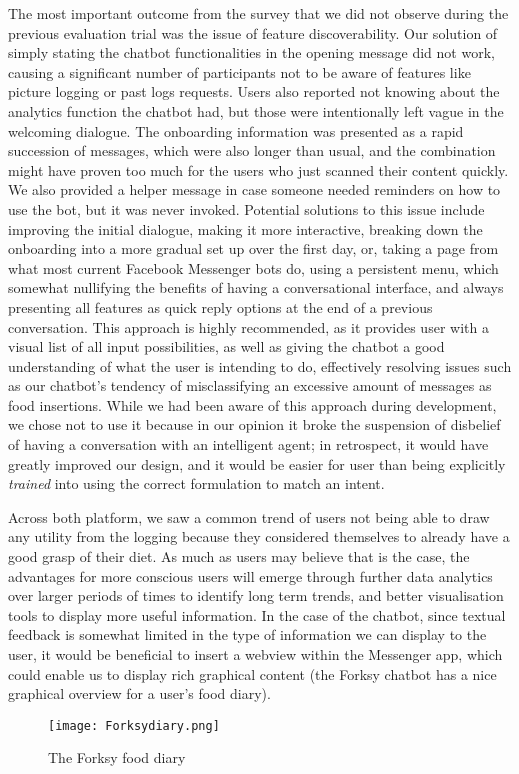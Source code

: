 The most important outcome from the survey that we did not observe during the previous evaluation trial was the issue of feature discoverability. Our solution of simply stating the chatbot functionalities in the opening message did not work, causing a significant number of participants not to be aware of features like picture logging or past logs requests. Users also reported not knowing about the analytics function the chatbot had, but those were intentionally left vague in the welcoming dialogue. The onboarding information was presented as a rapid succession of messages, which were also longer than usual, and the combination might have proven too much for the users who just scanned their content quickly. We also provided a helper message in case someone needed reminders on how to use the bot, but it was never invoked. Potential solutions to this issue include improving the initial dialogue, making it more interactive, breaking down the onboarding into a more gradual set up over the first day, or, taking a page from what most current Facebook Messenger bots do, using a persistent menu, which somewhat nullifying the benefits of having a conversational interface, and always presenting all features as quick reply options at the end of a previous conversation. This approach is highly recommended, as it provides user with a visual list of all input possibilities, as well as giving the chatbot a good understanding of what the user is intending to do, effectively resolving issues such as our chatbot's tendency of misclassifying an excessive amount of messages as food insertions. While we had been aware of this approach during development, we chose not to use it because in our opinion it broke the suspension of disbelief of having a conversation with an intelligent agent; in retrospect, it would have greatly improved our design, and it would be easier for user than being explicitly \textit{trained} into using the correct formulation to match an intent. 

Across both platform, we saw a common trend of users not being able to draw any utility from the logging because they considered themselves to already have a good grasp of their diet. As much as users may believe that is the case, the advantages for more conscious users will emerge through further data analytics over larger periods of times to identify long term trends, and better visualisation tools to display more useful information. In the case of the chatbot, since textual feedback is somewhat limited in the type of information we can display to the user, it would be beneficial to insert a webview within the Messenger app, which could enable us to display rich graphical content (the Forksy chatbot has a nice graphical overview for a user's food diary). \\
\begin{figure}[h!]
  \centering
  \texttt{[image: Forksydiary.png]}
  \caption{The Forksy food diary}
\end{figure} 


